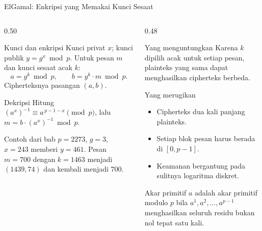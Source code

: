 \documentclass[aspectratio=169,11pt]{beamer}
\begin{document}
\begin{frame}{ElGamal: Enkripsi yang Memakai Kunci Sesaat}
    \scriptsize
    \begin{columns}[T,onlytextwidth]
        \begin{column}{0.50\textwidth}
            \begin{block}{Kunci dan enkripsi}
                Kunci privat $x$; kunci publik $y=g^{x}\bmod p$. Untuk pesan
                $m$ dan kunci sesaat acak $k$:
                \[
                    a=g^{k}\bmod p, \qquad b=y^{k}\cdot m \bmod p.
                \]
                Cipherteksnya pasangan $(a,b)$.
            \end{block}
            \begin{block}{Dekripsi}
                Hitung $(a^{x})^{-1} \equiv a^{\,p-1-x} \pmod p$, lalu
                $m=b\cdot(a^{x})^{-1}\bmod p$.
            \end{block}
            \begin{exampleblock}{Contoh dari bab}
                $p=2273$, $g=3$, $x=243$ memberi $y=461$. Pesan $m=700$
                dengan $k=1463$ menjadi $(1439,74)$ dan kembali menjadi $700$.
            \end{exampleblock}
        \end{column}
        \begin{column}{0.48\textwidth}
            \begin{block}{Yang menguntungkan}
                Karena $k$ dipilih acak untuk setiap pesan, plainteks yang sama
                dapat menghasilkan cipherteks berbeda.
            \end{block}
            \begin{alertblock}{Yang merugikan}
                \begin{itemize}
                    \setlength{\itemsep}{2pt}
                    \item Cipherteks dua kali panjang plainteks.
                    \item Setiap blok pesan harus berada di $[0,p-1]$.
                    \item Keamanan bergantung pada sulitnya logaritma diskret.
                \end{itemize}
            \end{alertblock}
            \begin{exampleblock}{Akar primitif}
                \footnotesize
                $a$ adalah akar primitif modulo $p$ bila
                $a^{1},a^{2},\dots,a^{p-1}$ menghasilkan seluruh residu bukan
                nol tepat satu kali.
            \end{exampleblock}
        \end{column}
    \end{columns}
\end{frame}
\end{document}
